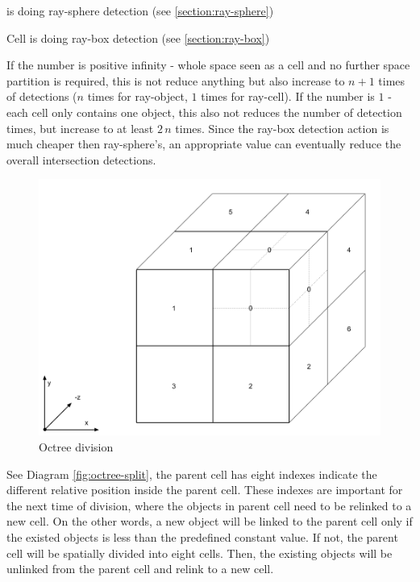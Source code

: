 \begin{description}
	\setlength{\parskip}{0pt}
	\item[$\bullet$ Object Complexity]  is doing ray-sphere detection (see \ref{section:ray-sphere})
	\item[$\bullet$ Cell Complexity] Cell is doing ray-box detection (see \ref{section:ray-box})
\end{description}

If the number is positive infinity - whole space seen as a cell and no further space partition is required, this is not reduce anything but also increase to $n + 1$ times of detections ($n$ times for ray-object, $1$ times for ray-cell). If the number is $1$ - each cell only contains one object, this also not reduces the number of detection times, but increase to at least $2\,n$ times. Since the ray-box detection action is much cheaper then ray-sphere's, an appropriate value can eventually reduce the overall intersection detections.

\begin{figure}[H]
\caption{Octree division}
\label{fig:octree-division}
\centering
\includegraphics[width=\linewidth]{Figures/octree-division.png}
\decoRule
\end{figure}

See Diagram \ref{fig:octree-split}, the parent cell has eight indexes indicate the different relative position inside the parent cell. These indexes are important for the next time of division, where the objects in parent cell need to be relinked to a new cell. On the other words, a new object will be linked to the parent cell only if the existed objects is less than the predefined constant value. If not, the parent cell will be spatially divided into eight cells. Then, the existing objects will be unlinked from the parent cell and relink to a new cell.

